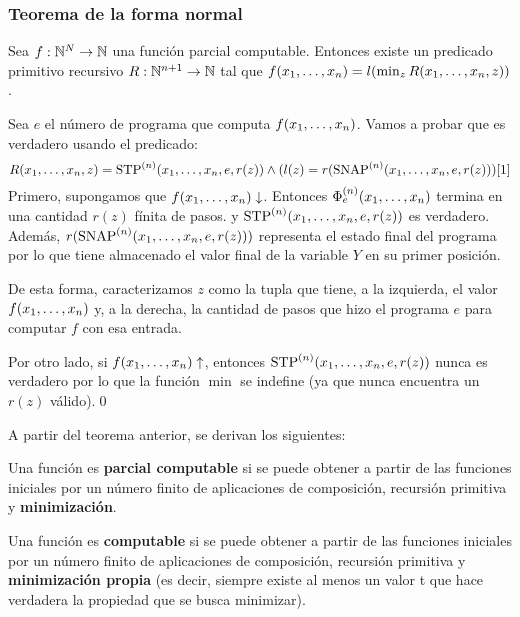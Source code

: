 \subsubsection{Teorema de la forma normal}
	\begin{teorema}\label{teorema::formaNormal}
	Sea $f:\mathbb{N}^N\to\mathbb{N}$ una función parcial computable. Entonces existe un predicado primitivo recursivo $R:\mathbb{N}^{n+1}\to\mathbb{N}$ tal que $f(x_1,\dots, x_{n}) = l(\min_z R(x_1,\dots, x_{n},z))$.
\end{teorema}
\begin{demo}
Sea $e$ el número de programa que computa $f(x_1,\dots, x_{n })$. Vamos a probar que es verdadero usando el predicado:
$$R(x_1,\dots, x_{n}, z) = \text{STP}^{(n)}(x_1,\dots, x_{n},e,r(z)) \land (l(z) = r(\text{SNAP}^{(n)}(x_1,\dots, x_{n},e,r(z)))[1]$$
Primero, supongamos que $f(x_1,\dots, x_{n})\downarrow$. Entonces $\Phi_e^{(n)}(x_1,\dots, x_{n})$ termina en una cantidad  $r(z)$ fínita de pasos.  y $\text{STP}^{(n)}(x_1,\dots, x_{n},e,r(z))$ es verdadero. Además, $r(\text{SNAP}^{(n)}(x_1,\dots, x_{n},e,r(z)))$ representa el estado final del programa por lo que tiene almacenado el valor final de la variable $Y$ en su primer posición.
\end{demo}
\begin{demoPart}
De esta forma, caracterizamos $z$ como la tupla que tiene, a la izquierda, el valor $f(x_1,\dots, x_{n})$ y, a la derecha, la cantidad de pasos que hizo el programa $e$ para computar $f$ con esa entrada.

Por otro lado, si $f(x_1,\dots, x_{n})\uparrow$, entonces $\text{STP}^{(n)}(x_1,\dots, x_{n},e,r(z))$ nunca es verdadero por lo que la función $\min$ se indefine (ya que nunca encuentra un $r(z)$ válido).\qed
\end{demoPart}

A partir del teorema anterior, se derivan los siguientes:

\begin{teorema}
	Una función es \textbf{parcial computable} si se puede obtener a partir de las funciones iniciales por un número finito de aplicaciones de composición, recursión primitiva y \textbf{minimización}.
\end{teorema}

\begin{teorema}
	Una función es \textbf{computable} si se puede obtener a partir de las funciones iniciales por un número finito de aplicaciones de composición, recursión primitiva y \textbf{minimización propia} (es decir, siempre existe al menos un valor t que hace verdadera la propiedad que se busca minimizar).
\end{teorema}
